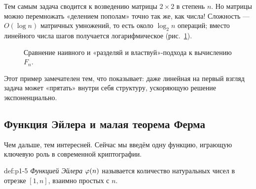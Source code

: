 \begin{importantbox}
Тем самым задача сводится к возведению матрицы $2{\times}2$ в степень $n$. Но матрицы можно перемножать «делением пополам» точно так же, как числа! Сложность --- $O(\log n)$ матричных умножений, то есть около $\log_2 n$ операций; вместо линейного числа шагов получается логарифмическое (рис.~\ref{fig:p1-3}).
\end{importantbox}

\begin{figure}[H]
\centering
{}
\caption{Сравнение наивного и «разделяй и властвуй»-подхода к вычислению $F_n$.}
\label{fig:p1-3}
\end{figure}

Этот пример замечателен тем, что показывает: даже линейная на первый взгляд задача может «прятать» внутри себя структуру, ускоряющую решение экспоненциально.

\subsection{Функция Эйлера и малая теорема Ферма}

Чем дальше, тем интересней. Сейчас мы введём одну функцию, играющую ключевую роль в современной криптографии.

\begin{definition}{}{def:p1-5}
\emph{Функцией Эйлера} $\varphi(n)$ называется количество натуральных чисел в отрезке $[1, n]$, взаимно простых с $n$.
\end{definition}

